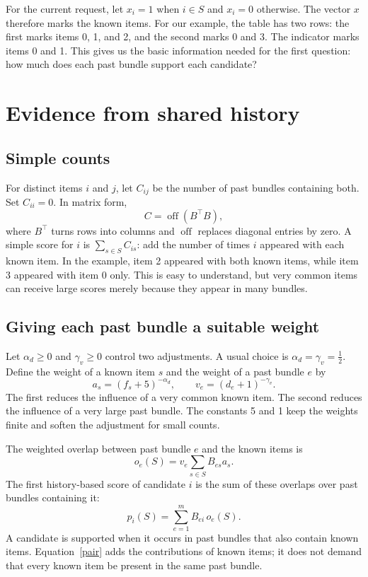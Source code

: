 \documentclass[11pt,a4paper]{article}
\numberwithin{equation}{section}
\begin{document}
For the current request, let $x_i=1$ when $i\in S$ and $x_i=0$ otherwise. The vector $x$
therefore marks the known items. For our example, the table has two rows: the first marks items 0, 1, and 2, and the second
marks 0 and 3. The indicator marks items 0 and 1. This gives us the basic information
needed for the first question: how much does each past bundle support each candidate?

\section{Evidence from shared history}
\subsection{Simple counts}
For distinct items $i$ and $j$, let $C_{ij}$ be the number of past bundles containing both.
Set $C_{ii}=0$. In matrix form,
\begin{equation}
 C=\operatorname{off}(B^\top B),
\end{equation}
where $B^\top$ turns rows into columns and $\operatorname{off}$ replaces diagonal entries
by zero. A simple score for $i$ is $\sum_{s\in S} C_{is}$: add the number of times $i$
appeared with each known item. In the example, item 2 appeared with both known items,
while item 3 appeared with item 0 only. This is easy to understand, but very common items can
receive large scores merely because they appear in many bundles.

\subsection{Giving each past bundle a suitable weight}
Let $\alpha_d\ge0$ and $\gamma_v\ge0$ control two adjustments. A usual choice is
$\alpha_d=\gamma_v=\tfrac12$. Define the weight of a known item $s$ and the weight of a
past bundle $e$ by
\begin{equation}
 a_s=(f_s+5)^{-\alpha_d},\qquad v_e=(d_e+1)^{-\gamma_v}.
\end{equation}
The first reduces the influence of a very common known item. The second reduces the
influence of a very large past bundle. The constants 5 and 1 keep the weights finite and
soften the adjustment for small counts.

The weighted overlap between past bundle $e$ and the known items is
\begin{equation}\label{overlap}
 o_e(S)=v_e\sum_{s\in S}B_{es}a_s.
\end{equation}
The first history-based score of candidate $i$ is the sum of these overlaps over past
bundles containing it:
\begin{equation}\label{pair}
 p_i(S)=\sum_{e=1}^{m}B_{ei}\,o_e(S).
\end{equation}
A candidate is supported when it occurs in past bundles that also contain known items.
Equation~\eqref{pair} adds the contributions of known items; it does not demand that every
known item be present in the same past bundle.
\end{document}
